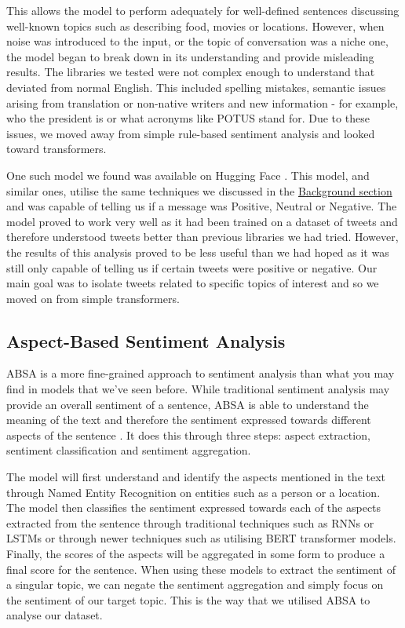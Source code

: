 This allows the model to perform adequately for well-defined sentences discussing well-known topics such as describing food, movies or locations. However, when noise was introduced to the input, or the topic of conversation was a niche one, the model began to break down in its understanding and provide misleading results. The libraries we tested were not complex enough to understand that deviated from normal English. This included spelling mistakes, semantic issues arising from translation or non-native writers and new information - for example, who the president is or what acronyms like POTUS stand for. Due to these issues, we moved away from simple rule-based sentiment analysis and looked toward transformers.

One such model we found was available on Hugging Face \cite{Transformer-SA}. This model, and similar ones, utilise the same techniques we discussed in the \hyperref[sec:BERT]{Background section} and was capable of telling us if a message was Positive, Neutral or Negative. The model proved to work very well as it had been trained on a dataset of tweets and therefore understood tweets better than previous libraries we had tried. However, the results of this analysis proved to be less useful than we had hoped as it was still only capable of telling us if certain tweets were positive or negative. Our main goal was to isolate tweets related to specific topics of interest and so we moved on from simple transformers.

\subsection{Aspect-Based Sentiment Analysis}

ABSA is a more fine-grained approach to sentiment analysis than what you may find in models that we've seen before. While traditional sentiment analysis may provide an overall sentiment of a sentence, ABSA is able to understand the meaning of the text and therefore the sentiment expressed towards different aspects of the sentence \cite{ABSA-paper}. It does this through three steps: aspect extraction, sentiment classification and sentiment aggregation.

The model will first understand and identify the aspects mentioned in the text through  Named Entity Recognition on entities such as a person or a location. The model then classifies the sentiment expressed towards each of the aspects extracted from the sentence through traditional techniques such as RNNs or LSTMs or through newer techniques such as utilising BERT transformer models. Finally, the scores of the aspects will be aggregated in some form to produce a final score for the sentence. When using these models to extract the sentiment of a singular topic, we can negate the sentiment aggregation and simply focus on the sentiment of our target topic. This is the way that we utilised ABSA to analyse our dataset.

